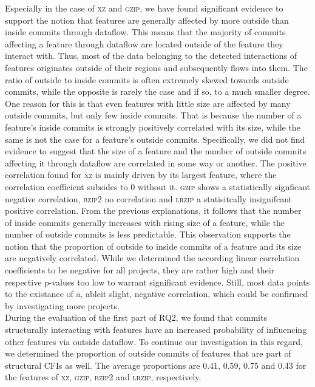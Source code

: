 Especially in the case of \textsc{xz} and \textsc{gzip}, we have found significant evidence to support the notion that features are generally affected by more outside than inside commits through dataflow.
This means that the majority of commits affecting a feature through dataflow are located outside of the feature they interact with.
Thus, most of the data belonging to the detected interactions of features originates outside of their regions and subsequently flows into them.
The ratio of outside to inside commits is often extremely skewed towards outside commits, while the opposite is rarely the case and if so, to a much smaller degree.
One reason for this is that even features with little size are affected by many outside commits, but only few inside commits.
That is because the number of a feature's inside commits is strongly positively correlated with its size, while the same is not the case for a feature's outside commits.
Specifically, we did not find evidence to suggest that the size of a feature and the number of outside commits affecting it through dataflow are correlated in some way or another.
The positive correlation found for \textsc{xz} is mainly driven by its largest feature, where the correlation coefficient subsides to 0 without it.
\textsc{gzip} shows a statistically signficant negative correlation, \textsc{bzip2} no correlation and \textsc{lrzip} a statisitcally insignifcant positive correlation.
From the previous explanations, it follows that the number of inside commits generally increases with rising size of a feature, while the number of outside commits is less predictable.
This observation supports the notion that the proportion of outside to inside commits of a feature and its size are negatively correlated.
While we determined the according linear correlation coefficients to be negative for all projects, they are rather high and their respective p-values too low to warrant significant evidence.
Still, most data points to the existance of a, ableit slight, negative correlation, which could be confirmed by investigating more projects. \\
During the evaluation of the first part of RQ2, we found that commits structurally interacting with features have an increased probability of influencing other features via outside dataflow.
To continue our investigation in this regard, we determined the proportion of outside commits of features that are part of structural CFIs as well.
The average proportions are 0.41, 0.59, 0.75 and 0.43 for the features of \textsc{xz}, \textsc{gzip}, \textsc{bzip2} and \textsc{lrzip}, respectively.
